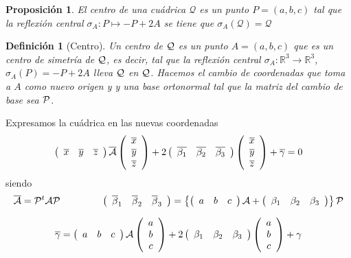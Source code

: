 \documentclass[11pt, a4paper]{article}
\newif\IfInSansMode
\theoremstyle{theorem-style}
\newtheorem{nprop}{Proposición}[section]
\theoremstyle{definition-style}
\newtheorem{ndef}{Definición}[section]
\theoremstyle{remark-style}
\theoremstyle{example-style}
\begin{document}
\begin{nprop}
	El centro de una cuádrica $\mathcal Q$ es un punto $P=(a,b,c)$ tal que la reflexión central $\sigma_A: P \mapsto -P+2A$ se tiene que $\sigma_A (\mathcal Q) = \mathcal Q$
\end{nprop}


\begin{ndef}[Centro]
	Un {\it centro} de $\cal Q$ es un punto $A=(a,b,c)$ que es un centro de simetr\'ia de $\cal Q$, es decir, tal que la reflexi\'on central $\sigma_A:\mathbb{R}^3\longrightarrow\mathbb{R}^3$, $\sigma_A(P)= -P+2A$ lleva  $\cal Q$ en $\cal Q$. Hacemos el cambio de coordenadas que toma a $A$ como nuevo origen y 
y una base ortonormal tal que la matriz del cambio de base sea $\cal P$.
\end{ndef}


Expresamos la cu\'adrica en las nuevas coordenadas
\[ 
\left( \begin{array}{ccc} 
\overline{x} & \overline{y} & \overline{z}   
 \end{array} \right)\overline{{\cal A}}
\left(\begin{array}{c}
\overline{x} \\
\overline{y} \\
\overline{z}  
\end{array} \right)
+
2
 \left( \begin{array}{ccc}
\overline{\beta_1} & \overline{\beta_2} & \overline{\beta_3}   
 \end{array} \right)
\left( \begin{array}{c}
\overline{x} \\
\overline{y} \\
\overline{z}  
 \end{array} \right)
+ \overline{\gamma} = 0
\]
siendo
\[
\overline{{\cal A}} = {\cal P}^t{\cal A}{\cal P} \hspace{1.5cm}
\left( \begin{array}{ccc}
\overline{\beta}_1 & \overline{\beta}_2 & \overline{\beta}_3   
 \end{array} \right) = 
  \left\{
\left( \begin{array}{ccc} 
a &  b &  c 
 \end{array} \right){\cal A} +
 \left( \begin{array}{ccc}
\beta_1 & \beta_2 & \beta_3   
 \end{array} \right) \right\}
{\cal P}
\]


\[
 \overline{\gamma} = \left( \begin{array}{ccc} 
a &  b & c 
 \end{array} \right){\cal A}
\left(\begin{array}{c}
a  \\
b \\
c  
\end{array} \right)  + 
2 \left( \begin{array}{ccc}
\beta_1 & \beta_2 & \beta_3   
 \end{array} \right)
\left( \begin{array}{c}
a \\
b \\
c  
 \end{array} \right)
+ \gamma
\]
\end{document}

